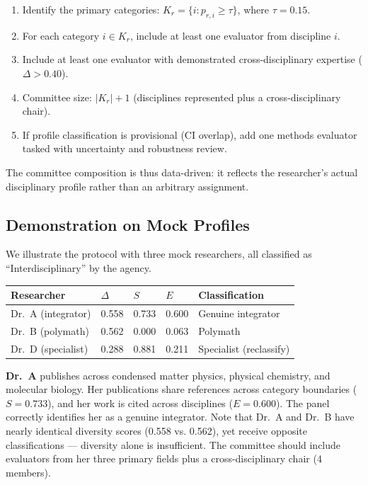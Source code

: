 \documentclass[
]{article}
\providecommand{\tightlist}{%
  \setlength{\itemsep}{0pt}\setlength{\parskip}{0pt}}
\begin{document}
\begin{enumerate}
\def\labelenumi{\arabic{enumi}.}
\tightlist
\item
  Identify the primary categories: \(K_r = \{i : p_{r,i} \geq \tau\}\),
  where \(\tau = 0.15\).
\item
  For each category \(i \in K_r\), include at least one evaluator from
  discipline \(i\).
\item
  Include at least one evaluator with demonstrated cross-disciplinary
  expertise (\(\Delta > 0.40\)).
\item
  Committee size: \(|K_r| + 1\) (disciplines represented plus a
  cross-disciplinary chair).
\item
  If profile classification is provisional (CI overlap), add one methods
  evaluator tasked with uncertainty and robustness review.
\end{enumerate}

The committee composition is thus data-driven: it reflects the
researcher's actual disciplinary profile rather than an arbitrary
assignment.

\hypertarget{demonstration-on-mock-profiles}{%
\subsection{Demonstration on Mock
Profiles}\label{demonstration-on-mock-profiles}}

We illustrate the protocol with three mock researchers, all classified
as ``Interdisciplinary'' by the agency.

\begin{longtable}[]{@{}lllll@{}}
\toprule
Researcher & \(\Delta\) & \(S\) & \(E\) & Classification \\
\midrule
\endhead
Dr.~A (integrator) & 0.558 & 0.733 & 0.600 & Genuine integrator \\
Dr.~B (polymath) & 0.562 & 0.000 & 0.063 & Polymath \\
Dr.~D (specialist) & 0.288 & 0.881 & 0.211 & Specialist (reclassify) \\
\bottomrule
\end{longtable}

\textbf{Dr.~A} publishes across condensed matter physics, physical
chemistry, and molecular biology. Her publications share references
across category boundaries (\(S = 0.733\)), and her work is cited across
disciplines (\(E = 0.600\)). The panel correctly identifies her as a
genuine integrator. Note that Dr.~A and Dr.~B have nearly identical
diversity scores (0.558 vs. 0.562), yet receive opposite classifications
--- diversity alone is insufficient. The committee should include
evaluators from her three primary fields plus a cross-disciplinary chair
(4 members).
\end{document}
